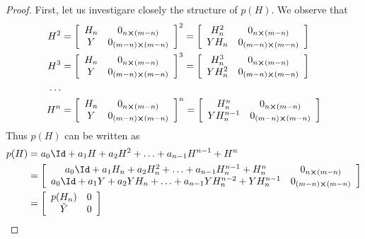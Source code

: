 \begin{proof}
	First, let us investigare closely the structure of \(p(H)\). We observe that
	\begin{align*}
		H^2 &= \left[\begin{array}{cc}
			H_n & 0_{n\cross(m-n)} \\
			Y & 0_{(m-n)\cross(m-n)}
			\end{array}\right]^2 = 
			\left[\begin{array}{cc}
				H_n^2 & 0_{n\cross(m-n)} \\
				Y H_n & 0_{(m-n)\cross(m-n)}
			\end{array}\right]\\
		H^3 &=
			\left[\begin{array}{cc}
				H_n & 0_{n\cross(m-n)} \\
				Y & 0_{(m-n)\cross(m-n)}
			\end{array}\right]^3 = 
			\left[\begin{array}{cc}
				H_n^3 & 0_{n\cross(m-n)} \\
				Y H_n^2 & 0_{(m-n)\cross(m-n)}
			\end{array}\right]\\
			\ldots\\
		H^n &= 			\left[\begin{array}{cc}
			H_n & 0_{n\cross(m-n)} \\
			Y & 0_{(m-n)\cross(m-n)}
		\end{array}\right]^n = 
		\left[\begin{array}{cc}
			H_n^n & 	  0_{n\cross(m-n)} \\
			Y H_n^{n-1} & 0_{(m-n)\cross(m-n)}
		\end{array}\right]\\
	\end{align*}
Thus \(p(H)\) can be written as
\begin{align*}
	p(H) &= a_0 \Id + a_1 H + a_2 H^2 + \ldots + a_{n-1} H^{n-1} + H^n \\
		&= \left[\begin{array}{cc}
			a_0 \Id + a_1 H_n + a_2 H_n^2 + \ldots + a_{n-1} H_n^{n-1} + H_n^n & 0_{n\cross(m-n)}\\
			a_0 \Id + a_1 Y + a_2 Y H_n + \ldots + a_{n-1} Y H_n^{n-2} + Y H_n^{n-1} & 0_{(m-n)\cross(m-n)}
		\end{array}\right]\\
		&= \left[\begin{array}{cc}
			p(H_n) & 0\\
			\tilde{Y} & 0
		\end{array}\right]
\end{align*}

\end{proof}
